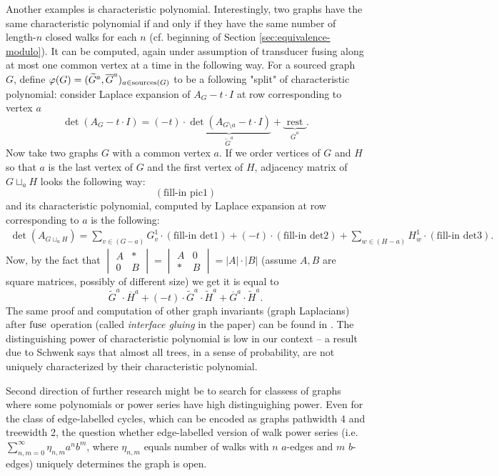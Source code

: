 Another examples is characteristic polynomial. Interestingly, two graphs have the same characteristic polynomial if and only if they have the same number of length-$n$ closed walks for each $n$ (cf. beginning of Section \ref{sec:equivalence-modulo}). It can be computed, again under assumption of transducer fusing along at most one common vertex at a time in the following way. For a sourced graph $G$, define $\varphi(G) = ({\widetilde{G}}^a, \overline{G}^a)_{a \in \operatorname{sources}(G)}$ to be a following "split" of characteristic polynomial: consider Laplace expansion of $A_G-t\cdot I$ at row corresponding to vertex $a$
$$
	\det(A_G-t\cdot I) = (-t)\cdot \underbrace{\det(A_{G\setminus a} - t\cdot I)}_{{\widetilde{G}}^a} + \underbrace{\text{ rest }}_{\overline{G}^a}.
$$
Now take two graphs $G$ with a common vertex $a$. If we order vertices of $G$ and $H$ so that $a$ is the last vertex of $G$ and the first vertex of $H$, adjacency matrix of $G\sqcup_aH$ looks the following way:
$$
	(\text{fill-in pic1})
$$
and its characteristic polynomial, computed by Laplace expansion at row corresponding to $a$ is the following:
\begin{multline*}
	\det(A_{G\sqcup_a H}) = \sum_{v \in (G- a)} G^1_v \cdot (\text{fill-in det1}) + (-t) \cdot (\text{fill-in det2}) + \sum_{w \in (H- a)} H^1_w \cdot (\text{fill-in det3}).
\end{multline*}
Now, by the fact that $\begin{vmatrix}
A & \ast\\
0 & B
\end{vmatrix}
=
\begin{vmatrix}
A & 0 \\
\ast & B
\end{vmatrix}
=
|A|\cdot|B|
$
(assume $A,B$ are square matrices, possibly of different size)
we get it is equal to
$$
	{\widetilde{G}}^a\cdot\overline{H}^a + (-t) \cdot {\widetilde{G}}^a \cdot {\widetilde{H}}^a + \overline{G}^a \cdot {\widetilde{H}}^a.
$$
The same proof and computation of other graph invariants (graph Laplacians) after $\operatorname{fuse}$ operation (called \emph{interface gluing} in the paper) can be found in \cite{contrerasGluingLaplacians20}.
The distinguishing power of characteristic polynomial is low in our context -- a result \cite{schwenkCospectral73} due to Schwenk says that almost all trees, in a sense of probability, are not uniquely characterized by their characteristic polynomial.

Second direction of further research might be to search for classess of graphs where some polynomials or power series have high distinguighing power. Even for the class of edge-labelled cycles, which can be encoded as graphs pathwidth 4 and treewidth 2, %
the question whether edge-labelled version of walk power series (i.e. $\sum_{n,m=0}^{\infty}\eta_{n,m} a^n b^m$, where $\eta_{n,m}$ equals number of walks with $n$ $a$-edges and $m$ $b$-edges) uniquely determines the graph is open.
